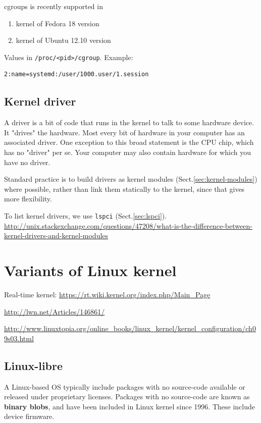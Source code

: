 cgroups is recently supported in 
\begin{enumerate}
  \item kernel of Fedora 18 version
  \item kernel of Ubuntu 12.10 version
\end{enumerate}

Values in \verb!/proc/<pid>/cgroup!. Example:
\begin{verbatim}
2:name=systemd:/user/1000.user/1.session
\end{verbatim}

\subsection{Kernel driver}

A driver is a bit of code that runs in the kernel to talk to some hardware
device. It "drives" the hardware. Most every bit of hardware in your computer
has an associated driver. One exception to this broad statement is the CPU chip,
which has no "driver" per se. Your computer may also contain hardware for which
you have no driver.

Standard practice is to build drivers as kernel modules
(Sect.\ref{sec:kernel-modules}) where possible, rather than link them statically
to the kernel, since that gives more flexibility.

To list kernel drivers, we use \verb!lspci! (Sect.\ref{sec:lspci}).
\url{http://unix.stackexchange.com/questions/47208/what-is-the-difference-between-kernel-drivers-and-kernel-modules}
\section{Variants of Linux kernel}


Real-time kernel: \url{https://rt.wiki.kernel.org/index.php/Main_Page}

\url{http://lwn.net/Articles/146861/}

\url{http://www.linuxtopia.org/online_books/linux_kernel/kernel_configuration/ch09s03.html}

\subsection{Linux-libre}

A Linux-based OS typically include packages with no source-code available or
released under proprietary licenses. Packages with no source-code are known as
{\bf binary blobs}, and have been included in Linux kernel since 1996. These
include device firmware.

